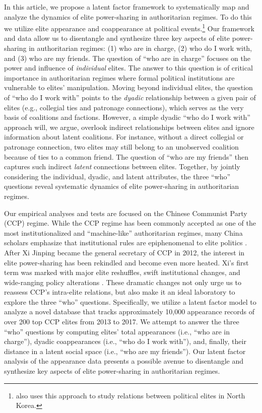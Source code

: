 \documentclass[11pt,english]{article}
\begin{document}
\begin{flushleft}
In this article, we propose a latent factor framework to systematically map and analyze the dynamics of elite power-sharing in authoritarian regimes. To do this we utilize elite appearance and coappearance at political events.\footnote{\citet{mahdavi_2019} also uses this approach to study relations between political elites in North Korea.} Our framework and data allow us to disentangle and synthesize three key aspects of elite power-sharing in authoritarian regimes: (1) who are in charge, (2) who do I work with, and (3) who are my friends. The question of ``who are in charge'' focuses on the power and influence of \emph{individual} elites. The answer to this question is of critical importance in authoritarian regimes where formal political institutions are vulnerable to elites' manipulation. Moving beyond individual elites, the question of ``who do I work with'' points to the \emph{dyadic} relationship between a given pair of elites (e.g., collegial ties and patronage connections), which serves as the very basis of coalitions and factions. However, a simple dyadic ``who do I work with'' approach will, we argue, overlook indirect relationships between elites and ignore information about latent coalitions. For instance, without a direct collegial or patronage connection, two elites may still belong to an unobserved coalition because of ties to a common friend. The question of ``who are my friends'' then captures such indirect \emph{latent} connections between elites. Together, by jointly considering the individual, dyadic, and latent attributes, the three ``who'' questions reveal systematic dynamics of elite power-sharing in authoritarian regimes.

Our empirical analyses and tests are focused on the Chinese Communist Party (CCP) regime. While the CCP regime has been commonly accepted as one of the most institutionalized and ``machine-like'' authoritarian regimes, many China scholars emphasize that institutional rules are epiphenomenal to elite politics \citep{Nathan1973,Tsou1976,Shih2010}. After Xi Jinping became the general secretary of CCP in 2012, the interest in elite power-sharing has been rekindled and become even more heated. Xi's first term was marked with major elite reshuffles, swift institutional changes, and wide-ranging policy alterations \citep{Miller2014b,Naughton2014,Lampton2015,Shirk2018}. These dramatic changes not only urge us to reassess CCP's intra-elite relations, but also make it an ideal laboratory to explore the three ``who'' questions. Specifically, we utilize a latent factor model \citep{Minhas2016a} to analyze a novel database that tracks approximately 10,000 appearance records of over 200 top CCP elites from 2013 to 2017. We attempt to answer the three ``who'' questions by computing elites' total appearances (i.e., ``who are in charge''), dyadic coappearances (i.e., ``who do I work with''), and, finally, their distance in a latent social space (i.e., ``who are my friends''). Our latent factor analysis of the appearance data presents a possible avenue to disentangle and synthesize key aspects of elite power-sharing in authoritarian regimes.


\end{flushleft}
\end{document}
